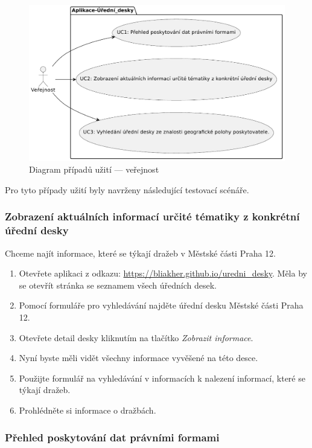 \begin{figure} 
\includegraphics[width=\textwidth]{cs/obrazky/use-case-diagram-verejnost.pdf}
\caption{Diagram případů užití --- veřejnost}
\label{fig:use-cases-verejnost}
\end{figure}

Pro tyto případy užití byly navrženy následující testovací scénáře.

\subsubsection{Zobrazení aktuálních informací určité tématiky z konkrétní úřední desky}

Chceme najít informace, které se týkají dražeb v Městské části Praha 12.
\begin{enumerate}
    \item Otevřete aplikaci z odkazu: 
    \url{https://bliakher.github.io/uredni_desky}. Měla by se otevřít stránka se seznamem všech úředních desek.
    \item Pomocí formuláře pro vyhledávání najděte úřední desku Městské části Praha 12.
    \item Otevřete detail desky kliknutím na tlačítko \textit{Zobrazit informace}.
    \item Nyní byste měli vidět všechny informace vyvěšené na této desce.
    \item Použijte formulář na vyhledávání v informacích k nalezení informací, které se týkají dražeb.
    \item Prohlédněte si informace o dražbách.
\end{enumerate}

\subsubsection{Přehled poskytování dat právními formami}

